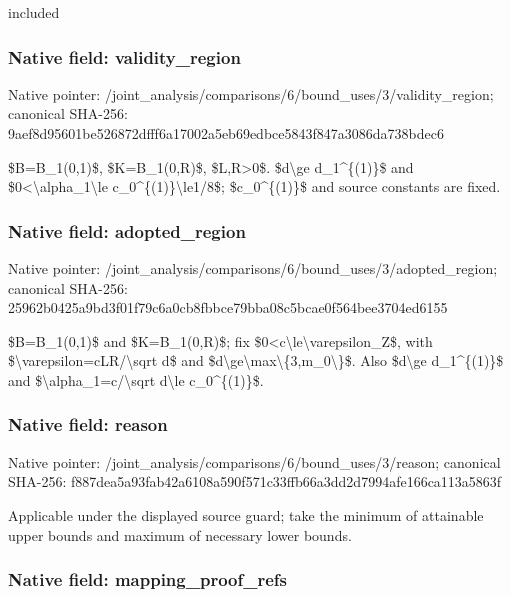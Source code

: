 \documentclass[10pt,a4paper]{article}
\begin{document}
included


\subsubsection{Native field: validity\_region}


Native pointer: /joint\_analysis/comparis\allowbreak{}ons/6/bound\_uses/3/valid\allowbreak{}ity\_region; canonical SHA-256: 9aef8d95601be526872dfff6\allowbreak{}a17002a5eb69edbce5843f84\allowbreak{}7a3086da738bdec6


\$B=B\_1(0,1)\$, \$K=B\_1(0,R)\$, \$L,R>0\$. \$d\textbackslash{}ge d\_1\textasciicircum{}\{(1)\}\$ and \$0<\textbackslash{}alpha\_1\textbackslash{}le c\_0\textasciicircum{}\{(1)\}\textbackslash{}le1/8\$; \$c\_0\textasciicircum{}\{(1)\}\$ and source constants are fixed.


\subsubsection{Native field: adopted\_region}


Native pointer: /joint\_analysis/comparis\allowbreak{}ons/6/bound\_uses/3/adopt\allowbreak{}ed\_region; canonical SHA-256: 25962b0425a9bd3f01f79c6a\allowbreak{}0cb8fbbce79bba08c5bcae0f\allowbreak{}564bee3704ed6155


\$B=B\_1(0,1)\$ and \$K=B\_1(0,R)\$; fix \$0<c\textbackslash{}le\textbackslash{}varepsilon\_Z\$, with \$\textbackslash{}varepsilon=cLR/\textbackslash{}sqrt d\$ and \$d\textbackslash{}ge\textbackslash{}max\textbackslash{}\{3,m\_0\textbackslash{}\}\$. Also \$d\textbackslash{}ge d\_1\textasciicircum{}\{(1)\}\$ and \$\textbackslash{}alpha\_1=c/\textbackslash{}sqrt d\textbackslash{}le c\_0\textasciicircum{}\{(1)\}\$.


\subsubsection{Native field: reason}


Native pointer: /joint\_analysis/comparis\allowbreak{}ons/6/bound\_uses/3/reaso\allowbreak{}n; canonical SHA-256: f887dea5a93fab42a6108a59\allowbreak{}0f571c33ffb66a3dd2d7994a\allowbreak{}fe166ca113a5863f


Applicable under the displayed source guard; take the minimum of attainable upper bounds and maximum of necessary lower bounds.


\subsubsection{Native field: mapping\_proof\_refs}
\end{document}

